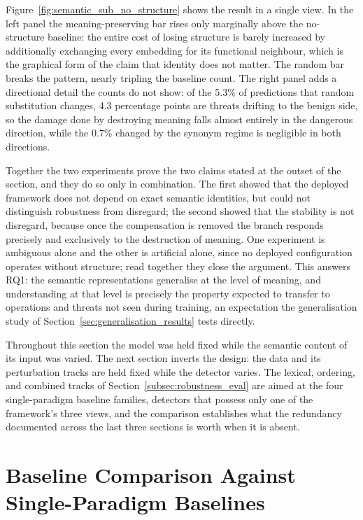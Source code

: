 \documentclass[%
    BCOR=10mm,
    DIV=13,
    toc=bibliography,
    toc=listof,
    oneside,
    12pt,
]{scrbook}
\begin{document}
Figure~\ref{fig:semantic_sub_no_structure} shows the result in a single view.
In the left panel the meaning-preserving bar rises only marginally above the
no-structure baseline: the entire cost of losing structure is barely
increased by additionally exchanging every embedding for its functional
neighbour, which is the graphical form of the claim that identity does not
matter. The random bar breaks the pattern, nearly tripling the baseline
count. The right panel adds a directional detail the counts do not show: of
the 5.3\% of predictions that random substitution changes, 4.3 percentage
points are threats drifting to the benign side, so the damage done by
destroying meaning falls almost entirely in the dangerous direction, while
the 0.7\% changed by the synonym regime is negligible in both directions.

Together the two experiments prove the two claims stated at the outset of
the section, and they do so only in combination. The first showed that the
deployed framework does not depend on exact semantic identities, but could
not distinguish robustness from disregard; the second showed that the
stability is not disregard, because once the compensation is removed the
branch responds precisely and exclusively to the destruction of meaning. One
experiment is ambiguous alone and the other is artificial alone, since no
deployed configuration operates without structure; read together they close
the argument. This answers RQ1: the semantic representations generalise at
the level of meaning, and understanding at that level is precisely the
property expected to transfer to operations and threats not seen during
training, an expectation the generalisation study of
Section~\ref{sec:generalisation_results} tests directly.

Throughout this section the model was held fixed while the semantic content
of its input was varied. The next section inverts the design: the data and
its perturbation tracks are held fixed while the detector varies. The
lexical, ordering, and combined tracks of
Section~\ref{subsec:robustness_eval} are aimed at the four single-paradigm
baseline families, detectors that possess only one of the framework's three
views, and the comparison establishes what the redundancy documented across
the last three sections is worth when it is absent.


\section{Baseline Comparison Against Single-Paradigm Baselines}
\label{sec:baseline_comparison}
\end{document}
